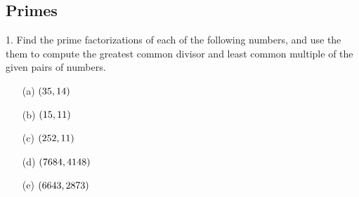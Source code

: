 \subsection{Primes}
\begin{mdframed}[style=darkQuesion]
  1. Find the prime factorizations of each of the following numbers, and use the
  them to compute the greatest common divisor and least common multiple of the
  given pairs of numbers.
  \begin{multicols}{3}
    \begin{itemize}
      \item [(a)] {$\left(35,14\right)$
            }
      \item [(b)] {$\left(15,11\right)$
            }
      \item [(c)] {$\left(252,11\right)$
            }
      \item [(d)] {$\left(7684,4148\right)$
            }
      \item [(e)] {$\left(6643,2873\right)$
            }
    \end{itemize}
  \end{multicols}
\end{mdframed}

